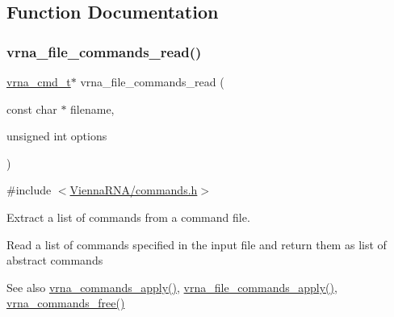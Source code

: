 \subsection{Function Documentation}
\mbox{\label{group__file__utils_ga5d2a64331cff5b1059e7d327545d8a63}} 
\subsubsection{\texorpdfstring{vrna\+\_\+file\+\_\+commands\+\_\+read()}{vrna\_file\_commands\_read()}}
{\footnotesize\ttfamily \hyperlink{group__file__utils_ga92cb3b5952352b103bcb32e5a99e0e5a}{vrna\+\_\+cmd\+\_\+t}$\ast$ vrna\+\_\+file\+\_\+commands\+\_\+read (\begin{DoxyParamCaption}\item[{const char $\ast$}]{filename,  }\item[{unsigned int}]{options }\end{DoxyParamCaption})}



{\ttfamily \#include $<$\hyperlink{commands_8h}{Vienna\+R\+N\+A/commands.\+h}$>$}



Extract a list of commands from a command file. 

Read a list of commands specified in the input file and return them as list of abstract commands

\begin{DoxySeeAlso}{See also}
\hyperlink{group__file__utils_ga5e993fc4b9602af73aaaab4d3b3cd9a9}{vrna\+\_\+commands\+\_\+apply()}, \hyperlink{group__file__utils_gadbe8c9622f7bcc6dcbe3448b98df8656}{vrna\+\_\+file\+\_\+commands\+\_\+apply()}, \hyperlink{group__file__utils_ga926fd7632e68f3da2e2069402b80b1ab}{vrna\+\_\+commands\+\_\+free()}
\end{DoxySeeAlso}

